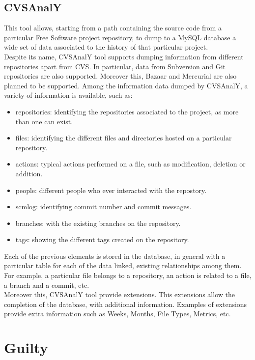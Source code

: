 \documentclass[11pt]{article}
\begin{document}
\subsection{CVSAnalY}
This tool allows, starting from a path containing the source code from a particular Free Software project repository, to dump to a MySQL database a wide set of data associated to the history of that particular project.\\

Despite its name, CVSAnalY tool supports dumping information from different repositories apart from CVS. In particular, data from Subversion and Git repositories are also supported. Moreover this, Bazaar and Mercurial are also planned to be supported. Among the information data dumped by CVSAnalY, a variety of information is available, such as:
\begin{itemize}
\item{repositories}: identifying the repositories associated to the project, as more than one can exist.
\item{files}: identifying the different files and directories hosted on a particular repository.
\item{actions}: typical actions performed on a file, such as modification, deletion or addition.
\item{people}: different people who ever interacted with the repostory.
\item{scmlog}: identifying commit number and commit messages.
\item{branches}: with the existing branches on the repository.
\item{tags}: showing the different tags created on the repository.
\end{itemize}

Each of the previous elements is stored in the database, in general with a particular table for each of the data linked, existing relationships among them. For example, a particular file belongs to a repository, an action is related to a file, a branch and a commit, etc.\\

Moreover this, CVSAnalY tool provide extensions. This extensions allow the completion of the database, with additional information. Examples of extensions provide extra information such as Weeks, Months, File Types, Metrics, etc.

\section{Guilty}
\end{document}

